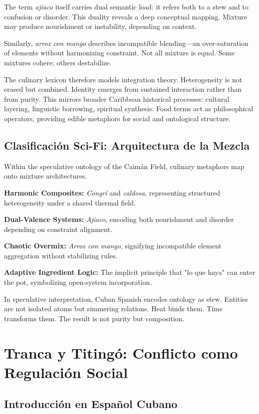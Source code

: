 \documentclass[12pt]{article}
\begin{document}
The term \textit{ajiaco} itself carries dual semantic load: it refers both to a stew and to confusion or disorder. This duality reveals a deep conceptual mapping. Mixture may produce nourishment or instability, depending on context.

Similarly, \textit{arroz con mango} describes incompatible blending---an over-saturation of elements without harmonizing constraint. Not all mixture is equal. Some mixtures cohere; others destabilize.

The culinary lexicon therefore models integration theory. Heterogeneity is not erased but combined. Identity emerges from sustained interaction rather than from purity. This mirrors broader Caribbean historical processes: cultural layering, linguistic borrowing, spiritual synthesis. Food terms act as philosophical operators, providing edible metaphors for social and ontological structure.

\subsection*{Clasificación Sci-Fi: Arquitectura de la Mezcla}

Within the speculative ontology of the Caimán Field, culinary metaphors map onto mixture architectures.

\textbf{Harmonic Composites:} \textit{Congrí} and \textit{caldosa}, representing structured heterogeneity under a shared thermal field.

\textbf{Dual-Valence Systems:} \textit{Ajiaco}, encoding both nourishment and disorder depending on constraint alignment.

\textbf{Chaotic Overmix:} \textit{Arroz con mango}, signifying incompatible element aggregation without stabilizing rules.

\textbf{Adaptive Ingredient Logic:} The implicit principle that "lo que haya" can enter the pot, symbolizing open-system incorporation.

In speculative interpretation, Cuban Spanish encodes ontology as stew. Entities are not isolated atoms but simmering relations. Heat binds them. Time transforms them. The result is not purity but composition.

\section{Tranca y Titingó: Conflicto como Regulación Social}

\subsection*{Introducción en Español Cubano}
\end{document}

